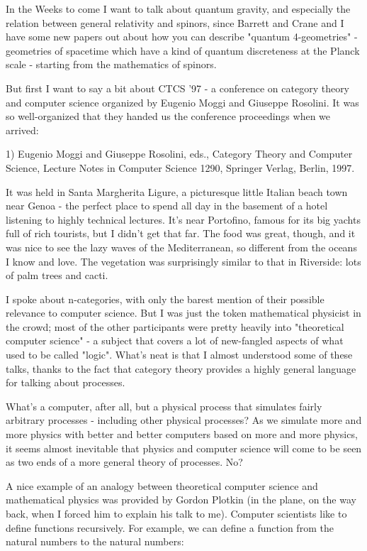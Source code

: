

In the Weeks to come I want to talk about quantum gravity, and
especially the relation between general relativity and spinors, since
Barrett and Crane and I have some new papers out about how you can
describe "quantum 4-geometries" - geometries of spacetime which have a
kind of quantum discreteness at the Planck scale - starting from the
mathematics of spinors.

But first I want to say a bit about CTCS '97 - a conference on
category theory and computer science organized by Eugenio Moggi and
Giuseppe Rosolini.   It was so well-organized that they handed
us the conference proceedings when we arrived: 

1) Eugenio Moggi and Giuseppe Rosolini, eds., Category Theory and
Computer Science, Lecture Notes in Computer Science 1290, Springer
Verlag, Berlin, 1997.

It was held in Santa Margherita Ligure, a picturesque little Italian
beach town near Genoa - the perfect place to spend all day in the
basement of a hotel listening to highly technical lectures.   It's near
Portofino, famous for its big yachts full of rich tourists, but I didn't
get that far.   The food was great, though, and it was nice to see the
lazy waves of the Mediterranean, so different from the oceans I know and
love.   The vegetation was surprisingly similar to that in Riverside:
lots of palm trees and cacti.
 
I spoke about n-categories, with only the barest mention of their
possible relevance to computer science.  But I was just the token
mathematical physicist in the crowd; most of the other participants were
pretty heavily into "theoretical computer science" - a subject that
covers a lot of new-fangled aspects of what used to be called "logic".  
What's neat is that I almost understood some of these talks, thanks to
the fact that category theory provides a highly general language for
talking about processes.  

What's a computer, after all, but a physical process that simulates
fairly arbitrary processes - including other physical processes?  As
we simulate more and more physics with better and better computers based
on more and more physics, it seems almost inevitable that physics and
computer science will come to be seen as two ends of a more general
theory of processes.  No?

A nice example of an analogy between theoretical computer science and
mathematical physics was provided by Gordon Plotkin (in the plane,
on the way back, when I forced him to explain his talk to me).  Computer
scientists like to define functions recursively.  For example, we
can define a function from the natural numbers to the natural numbers:

